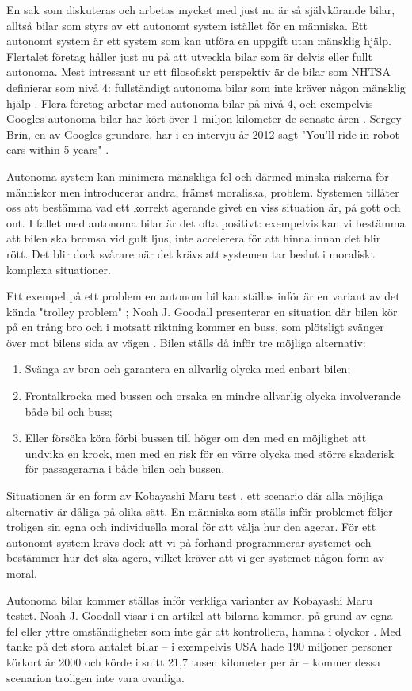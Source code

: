 En sak som diskuteras och arbetas mycket med just nu är så självkörande bilar, alltså bilar som styrs av ett autonomt system istället för en människa. Ett autonomt system är ett system som kan utföra en uppgift utan mänsklig hjälp. Flertalet företag håller just nu på att utveckla bilar som är delvis eller fullt autonoma. Mest intressant ur ett filosofiskt perspektiv är de bilar som NHTSA definierar som nivå 4: fullständigt autonoma bilar som inte kräver någon mänsklig hjälp \cite{nhtsa}. Flera företag arbetar med autonoma bilar på nivå 4, och exempelvis Googles autonoma bilar har kört över 1 miljon kilometer de senaste åren \cite{googlecars}. Sergey Brin, en av Googles grundare, har i en intervju år 2012 sagt "You'll ride in robot cars within 5 years" \cite{sergeybrin}.

Autonoma system kan minimera mänskliga fel och därmed minska riskerna för människor men introducerar andra, främst moraliska, problem. Systemen tillåter oss att bestämma vad ett korrekt agerande givet en viss situation är, på gott och ont. I fallet med autonoma bilar är det ofta positivt: exempelvis kan vi bestämma att bilen ska bromsa vid gult ljus, inte accelerera för att hinna innan det blir rött. Det blir dock svårare när det krävs att systemen tar beslut i moraliskt komplexa situationer.

Ett exempel på ett problem en autonom bil kan ställas inför är en variant av det kända "trolley problem" \cite{trolleyproblem}; Noah J. Goodall presenterar en situation där bilen kör på en trång bro och i motsatt riktning kommer en buss, som plötsligt svänger över mot bilens sida av vägen \cite{goodall2014ethical}. Bilen ställs då inför tre möjliga alternativ:
\begin{enumerate}
    \item Svänga av bron och garantera en allvarlig olycka med enbart bilen;
    \item Frontalkrocka med bussen och orsaka en mindre allvarlig olycka involverande både bil och buss;
    \item Eller försöka köra förbi bussen till höger om den med en möjlighet att undvika en krock, men med en risk för en värre olycka med större skaderisk för passagerarna i både bilen och bussen.
\end{enumerate}

Situationen är en form av Kobayashi Maru test \cite{kobayashimaru}, ett scenario där alla möjliga alternativ är dåliga på olika sätt. En människa som ställs inför problemet följer troligen sin egna och individuella moral för att välja hur den agerar. För ett autonomt system krävs dock att vi på förhand programmerar systemet och bestämmer hur det ska agera, vilket kräver att vi ger systemet någon form av moral.

Autonoma bilar kommer ställas inför verkliga varianter av Kobayashi Maru testet. Noah J. Goodall visar i en artikel att bilarna kommer, på grund av egna fel eller yttre omständigheter som inte går att kontrollera, hamna i olyckor \cite{machineethics}. Med tanke på  det stora antalet bilar – i exempelvis USA hade 190 miljoner personer körkort år 2000 \cite{licenseddrivers} och körde i snitt 21,7 tusen kilometer per år \cite{avgmiles} – kommer dessa scenarion troligen inte vara ovanliga.
